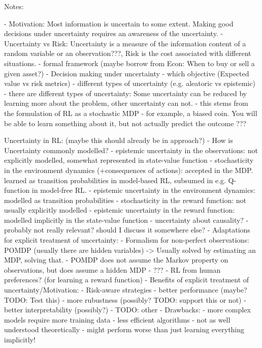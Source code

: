 Notes:

- Motivation: Most information is uncertain to some extent. Making good decisions under uncertainty requires an awareness of the uncertainty.
- Uncertainty vs Risk: Uncertainty is a measure of the information content of a random variable or an observation???, Risk is the cost associated with different situations.
- formal framework (maybe borrow from Econ: When to buy or sell a given asset?)
- Decision making under uncertainty
    - which objective (Expected value vs risk metrics)
- different types of uncertainty (e.g. aleatoric vs epistemic)
    - there are different types of uncertainty: Some uncertainty can be reduced by learning more about the problem, other uncertainty can not.
    - this stems from the formulation of RL as a stochastic MDP
    - for example, a biased coin. You will be able to learn something about it, but not actually predict the outcome ???

Uncertainty in RL: (maybe this should already be in approach?)
- How is Uncertainty commonly modelled?
    - epistemic uncertainty in the observations: not explicitly modelled, somewhat represented in state-value function
    - stochasticity in the environment dynamics (+consequences of actions): accepted in the MDP. learned as transition probabilities in model-based RL, subsumed in e.g. Q-function in model-free RL.
    - epistemic uncertainty in the environment dynamics: modelled as transition probabilities
    - stochasticity in the reward function: not usually explicitly modelled
    - epistemic uncertainty in the reward function: modelled implicitly in the state-value function
    - uncertainty about causality? - probably not really relevant? should I discuss it somewhere else?
- Adaptations for explicit treatment of uncertainty:
    - Formalism for non-perfect observations: POMDP (usually there are hidden variables) -> Usually solved by estimating an MDP, solving that.
        - POMDP does not assume the Markov property on observations, but does assume a hidden MDP
    - ???
    - RL from human preferences? (for learning a reward function)
- Benefits of explicit treatment of uncertainty/Motivation:
    - Risk-aware strategies
    - better performance (maybe? TODO: Test this)
    - more rubustness (possibly? TODO: support this or not)
    - better interpretability (possibly?)
    - TODO: other
- Drawbacks:
    - more complex models require more training data
    - less efficient algorithms
    - not as well understood theoretically
    - might perform worse than just learning everything implicitly!
    
